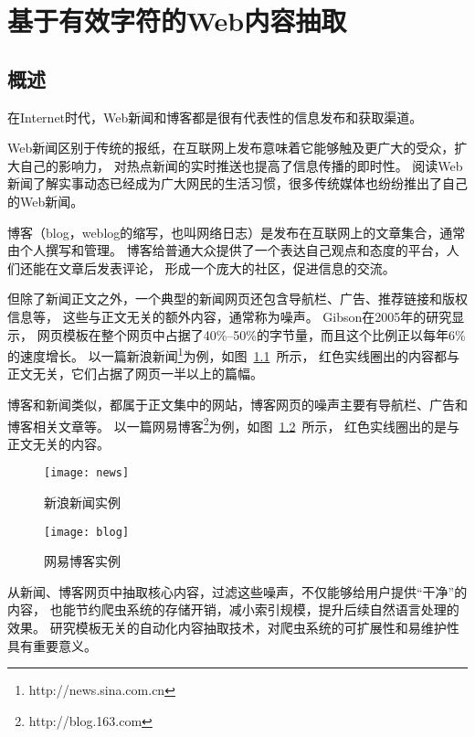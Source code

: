 
\chapter{基于有效字符的Web内容抽取}

\section{概述}
\label{sec:cevc-intro}
在Internet时代，Web新闻和博客都是很有代表性的信息发布和获取渠道。

Web新闻区别于传统的报纸，在互联网上发布意味着它能够触及更广大的受众，扩大自己的影响力，
对热点新闻的实时推送也提高了信息传播的即时性。
阅读Web新闻了解实事动态已经成为广大网民的生活习惯，很多传统媒体也纷纷推出了自己的Web新闻。

博客（blog，weblog的缩写，也叫网络日志）是发布在互联网上的文章集合，通常由个人撰写和管理。
博客给普通大众提供了一个表达自己观点和态度的平台，人们还能在文章后发表评论，
形成一个庞大的社区，促进信息的交流。

但除了新闻正文之外，一个典型的新闻网页还包含导航栏、广告、推荐链接和版权信息等，
这些与正文无关的额外内容，通常称为噪声。
Gibson在2005年的研究\cite{gibson2005volume}显示，
网页模板在整个网页中占据了40\%--50\%的字节量，而且这个比例正以每年6\%的速度增长。
以一篇新浪新闻\footnote{http://news.sina.com.cn}为例，如图~\ref{fig:news}~所示，
红色实线圈出的内容都与正文无关，它们占据了网页一半以上的篇幅。

博客和新闻类似，都属于正文集中的网站，博客网页的噪声主要有导航栏、广告和博客相关文章等。
以一篇网易博客\footnote{http://blog.163.com}为例，如图~\ref{fig:blog}~所示，
红色实线圈出的是与正文无关的内容。

\begin{figure}[htbp]
\centering
\texttt{[image: news]}
\caption{新浪新闻实例}
\label{fig:news}
\end{figure}

\begin{figure}[htbp]
\centering
\texttt{[image: blog]}
\caption{网易博客实例}
\label{fig:blog}
\end{figure}

从新闻、博客网页中抽取核心内容，过滤这些噪声，不仅能够给用户提供“干净”的内容，
也能节约爬虫系统的存储开销，减小索引规模，提升后续自然语言处理的效果。
研究模板无关的自动化内容抽取技术，对爬虫系统的可扩展性和易维护性具有重要意义。

